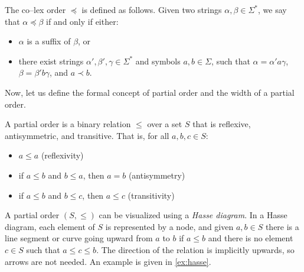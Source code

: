 \begin{definition} 
    The co--lex order $\preceq$ is defined as follows. Given two strings $\alpha, \beta \in \Sigma^*$, we say that $\alpha \preceq \beta$ if and only if either:
    \begin{itemize}
        \item $\alpha$ is a suffix of $\beta$, or
        \item there exist strings $\alpha', \beta', \gamma \in \Sigma^*$ and symbols $a, b \in \Sigma$, such that $\alpha = \alpha'a\gamma$, $\beta = \beta'b\gamma$, and $a \prec b$.
    \end{itemize}
\end{definition}

Now, let us define the formal concept of partial order and the width of a partial order. 
\begin{definition}
    A partial order is a binary relation $\leq$ over a set $S$ that is reflexive, antisymmetric, and transitive. That is, for all $a, b, c \in S$:
    \begin{itemize}
        \item $a \leq a$ (reflexivity)
        \item if $a \leq b$ and $b \leq a$, then $a = b$ (antisymmetry)
        \item if $a \leq b$ and $b \leq c$, then $a \leq c$ (transitivity)
    \end{itemize}
\end{definition}

A partial order $(S, \leq)$ can be visualized using a \textit{Hasse diagram}. In a Hasse diagram, each element of $S$ is represented by a node, and given $a,b \in S$ there is a line segment or curve going upward from $a$ to $b$ if $a \leq b$ and there is no element $c\in S$ such that $a \leq c \leq b$. The direction of the relation is implicitly upwards, so arrows are not needed. An example is given in \cref{ex:hasse}.

